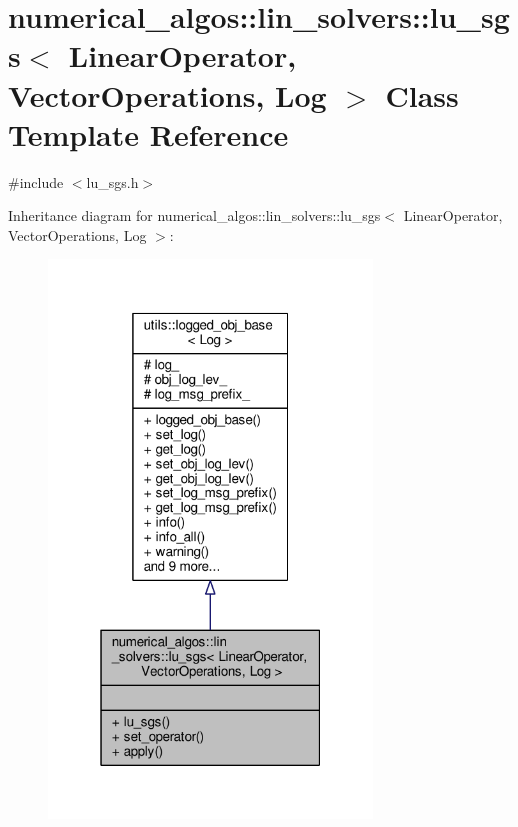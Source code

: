 \hypertarget{classnumerical__algos_1_1lin__solvers_1_1lu__sgs}{\section{numerical\-\_\-algos\-:\-:lin\-\_\-solvers\-:\-:lu\-\_\-sgs$<$ Linear\-Operator, Vector\-Operations, Log $>$ Class Template Reference}
\label{classnumerical__algos_1_1lin__solvers_1_1lu__sgs}
}


{\ttfamily \#include $<$lu\-\_\-sgs.\-h$>$}



Inheritance diagram for numerical\-\_\-algos\-:\-:lin\-\_\-solvers\-:\-:lu\-\_\-sgs$<$ Linear\-Operator, Vector\-Operations, Log $>$\-:
\nopagebreak
\begin{figure}[H]
\begin{center}
\leavevmode
\includegraphics[width=244pt]{classnumerical__algos_1_1lin__solvers_1_1lu__sgs__inherit__graph}
\end{center}
\end{figure}


